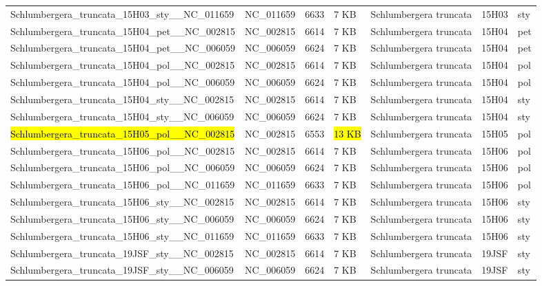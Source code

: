 \documentclass[fleqn,10pt,lineno]{wlpeerj}
\begin{document}
\begin{table}[ht]
{\begin{tabular}{@{}lllllll@{}}
Schlumbergera\_truncata\_15H03\_sty\_\_NC\_011659    & NC\_011659  & 6633            & 7 KB  & Schlumbergera truncata & 15H03        & sty          \\
Schlumbergera\_truncata\_15H04\_pet\_\_NC\_002815    & NC\_002815  & 6614            & 7 KB  & Schlumbergera truncata & 15H04        & pet          \\
Schlumbergera\_truncata\_15H04\_pet\_\_NC\_006059    & NC\_006059  & 6624            & 7 KB  & Schlumbergera truncata & 15H04        & pet          \\
Schlumbergera\_truncata\_15H04\_pol\_\_NC\_002815    & NC\_002815  & 6614            & 7 KB  & Schlumbergera truncata & 15H04        & pol          \\
Schlumbergera\_truncata\_15H04\_pol\_\_NC\_006059    & NC\_006059  & 6624            & 7 KB  & Schlumbergera truncata & 15H04        & pol          \\
Schlumbergera\_truncata\_15H04\_sty\_\_NC\_002815    & NC\_002815  & 6614            & 7 KB  & Schlumbergera truncata & 15H04        & sty          \\
Schlumbergera\_truncata\_15H04\_sty\_\_NC\_006059    & NC\_006059  & 6624            & 7 KB  & Schlumbergera truncata & 15H04        & sty          \\
\hl{Schlumbergera\_truncata\_15H05\_pol\_\_NC\_002815}    & NC\_002815  & 6553            & \hl{13 KB} & Schlumbergera truncata & 15H05        & pol          \\
Schlumbergera\_truncata\_15H06\_pol\_\_NC\_002815    & NC\_002815  & 6614            & 7 KB  & Schlumbergera truncata & 15H06        & pol          \\
Schlumbergera\_truncata\_15H06\_pol\_\_NC\_006059    & NC\_006059  & 6624            & 7 KB  & Schlumbergera truncata & 15H06        & pol          \\
Schlumbergera\_truncata\_15H06\_pol\_\_NC\_011659    & NC\_011659  & 6633            & 7 KB  & Schlumbergera truncata & 15H06        & pol          \\
Schlumbergera\_truncata\_15H06\_sty\_\_NC\_002815    & NC\_002815  & 6614            & 7 KB  & Schlumbergera truncata & 15H06        & sty          \\
Schlumbergera\_truncata\_15H06\_sty\_\_NC\_006059    & NC\_006059  & 6624            & 7 KB  & Schlumbergera truncata & 15H06        & sty          \\
Schlumbergera\_truncata\_15H06\_sty\_\_NC\_011659    & NC\_011659  & 6633            & 7 KB  & Schlumbergera truncata & 15H06        & sty          \\
Schlumbergera\_truncata\_19JSF\_sty\_\_NC\_002815    & NC\_002815  & 6614            & 7 KB  & Schlumbergera truncata & 19JSF        & sty          \\
Schlumbergera\_truncata\_19JSF\_sty\_\_NC\_006059    & NC\_006059  & 6624            & 7 KB  & Schlumbergera truncata & 19JSF        & sty          \\ \bottomrule
\end{tabular}%
}
\end{table}
\end{document}
